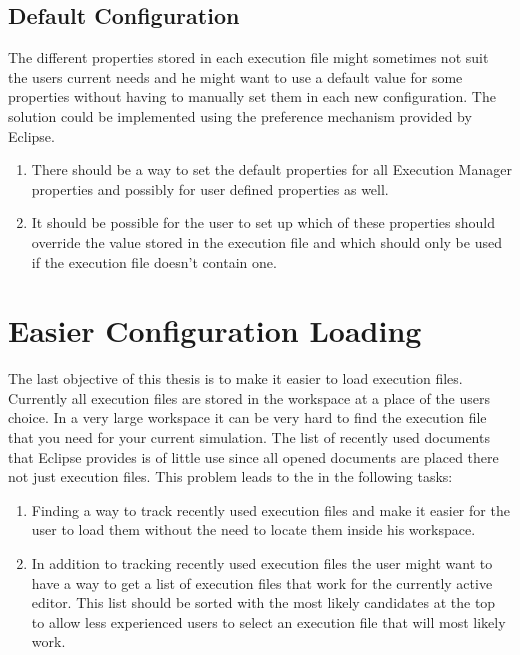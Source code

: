 \subsection{Default Configuration}
\label{section:ConfTaskDefaultConfig}
The different properties stored in each execution file might sometimes not suit the users current needs
and he might want to use a default value for some properties without having to manually set them
in each new configuration.
The solution could be implemented using the preference mechanism provided by Eclipse.
\begin{enumerate}
 \item There should be a way to set the default properties for all Execution Manager properties 
and possibly for user defined properties as well.
 \item It should be possible for the user to set up which of these properties should override 
the value stored in the execution file and which
should only be used if the execution file doesn't contain one.
\end{enumerate}

\section{Easier Configuration Loading}
\label{section:ConfTaskEasyLoading}
The last objective of this thesis is to make it easier to load execution files.
Currently all execution files are stored in the workspace at a place of the users choice. In a very
large workspace it can be very hard to find the execution file that you need for your current
simulation. The list of recently used documents that Eclipse provides is of little use since all
opened documents are placed there not just execution files.
This problem leads to the in the following tasks:
\begin{enumerate}
 \item Finding a way to track recently used execution files and make it easier for the user to
load them without the need to locate them inside his workspace.
 \item In addition to tracking recently used execution files the user might want to have a way to get a list
of execution files that work for the currently active editor. This list should be sorted with the most likely
candidates at the top to allow less experienced users to select an execution file that will most likely work.
\end{enumerate}
